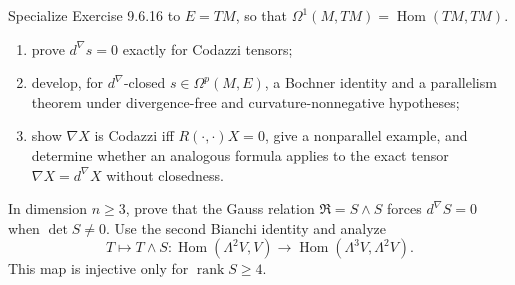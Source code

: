 \begin{remark}
  \label{rem:pet-ch9-exercise-9-6-17}
  Specialize Exercise 9.6.16 to $E=TM$, so that
  $\Omega^1(M,TM)=\operatorname{Hom}(TM,TM)$.
  \begin{enumerate}
    \item[(1)] prove $d^\nabla s=0$ exactly for Codazzi tensors;
    \item[(2)] develop, for $d^\nabla$-closed $s\in\Omega^p(M,E)$, a
      Bochner identity and a parallelism theorem under divergence-free and
      curvature-nonnegative hypotheses;
    \item[(3)] show $\nabla X$ is Codazzi iff
      $R(\cdot,\cdot)X=0$, give a nonparallel example, and determine whether
      an analogous formula applies to the exact tensor $\nabla X=d^\nabla X$
      without closedness.
  \end{enumerate}
\end{remark}

\begin{remark}
  \label{rem:pet-ch9-exercise-9-6-18}
  In dimension $n\ge3$, prove that the Gauss relation
  $\mathfrak R=S\wedge S$ forces $d^\nabla S=0$ when $\det S\ne0$.  Use the
  second Bianchi identity and analyze
  \[
    T\longmapsto T\wedge S:
    \operatorname{Hom}(\Lambda^2V,V)\to\operatorname{Hom}(\Lambda^3V,\Lambda^2V).
  \]
  This map is injective only for $\operatorname{rank}S\ge4$.
\end{remark}
